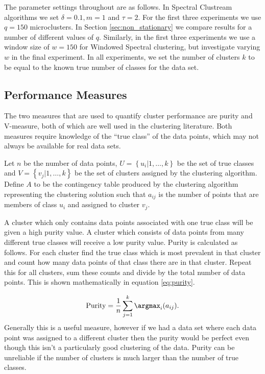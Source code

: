 The parameter settings throughout are as follows. In Spectral Clustream algorithms we set $\delta = 0.1, m = 1$ and $ \tau = 2$. For the first three experiments we use $q = 150$ microclusters. In Section \ref{sec:non_stationary} we compare results for a number of different values of $q$. Similarly, in the first three experiments we use a window size of $w = 150$ for Windowed Spectral clustering, but investigate varying $w$ in the final experiment. In all experiments, we set the number of clusters $k$ to be equal to the known true number of classes for the data set. 

\subsection{Performance Measures}
\label{sec:performance}
The two measures that are used to quantify cluster performance are purity and V-measure, both of which are well used in the clustering literature. Both measures require knowledge of the ``true class'' of the data points, which may not always be available for real data sets.  

Let $n$ be the number of data points, $U = \left\{ u_i | 1, \ldots, k  \right\} $ be the set of true classes and $V = \left\{ v_j | 1, \ldots, k \right\}$ be the set of clusters assigned by the clustering algorithm.  Define $A$  to be  the contingency table produced by the clustering algorithm representing the clustering solution such that $a_{ij}$ is the number of points that are members of class $u_i$ and assigned to cluster $v_j$.

 A cluster which only contains data points associated with one true class will be given a high purity value. A cluster which consists of data points from many different true classes will receive a low purity value.  Purity is calculated as follows. For each cluster find the true class which is most prevalent in that cluster and count how many data points of that class there are in that cluster. Repeat this for all clusters, sum these counts and divide by the total number of data points. This is shown mathematically in equation \eqref{eq:purity}.

\begin{equation}
  \label{eq:purity}
  \text{Purity} = \frac{1}{n} \sum_{j = 1}^{k} \argmax_{i} (a_{ij}).
\end{equation}
Generally this is a useful measure, however if we had a data set where each data point was assigned to a different cluster then the purity would be perfect even though this isn't a particularly good clustering of the data. Purity can be unreliable if the number of clusters is much larger than the number of true classes. 

